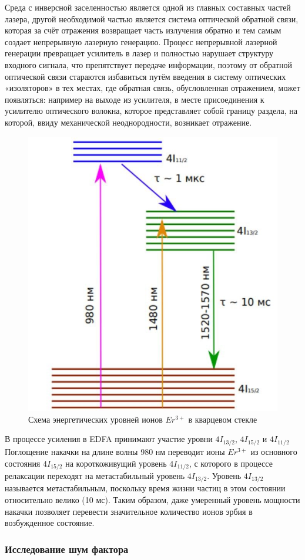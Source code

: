 \documentclass[12pt,a4paper]{article}
\begin{document}
Среда с инверсной заселенностью является одной из главных
составных частей лазера, другой необходимой частью является система
оптической обратной связи, которая за счёт отражения возвращает часть
излучения обратно и тем самым создает непрерывную лазерную генерацию. Процесс непрерывной лазерной генерации превращает
усилитель в лазер и полностью нарушает структуру входного сигнала, что
препятствует передаче информации, поэтому от обратной оптической
связи стараются избавиться путём введения в систему оптических
«изоляторов» в тех местах, где обратная связь, обусловленная
отражением, может появляться: например на выходе из усилителя, в месте
присоединения к усилителю оптического волокна, которое представляет
собой границу раздела, на которой, ввиду механической неоднородности,
возникает отражение.
\begin{figure}[h!]
		\centering
		\includegraphics[width=0.60\linewidth]{levels.jpg}
		\caption{Схема энергетических уровней ионов  $Er^{3+}$ в кварцевом стекле}
		\label{labC}
	\end{figure}

 
 В процессе усиления в EDFA принимают участие уровни $4I_{13/2}$, $4I_{15/2}$ и
$4I_{11/2}$ Поглощение накачки на длине волны 980 нм переводит ионы $Er^{3+}$  из
основного состояния $4I_{15/2}$ на короткоживущий уровень $4I_{11/2}$, с которого в
процессе релаксации переходят на метастабильный уровень $4I_{13/2}$.
Уровень $4I_{13/2}$ называется метастабильным, поскольку время жизни частиц
в этом состоянии относительно велико (10 мс). Таким образом, даже
умеренный уровень мощности накачки позволяет перевести значительное
количество ионов эрбия в возбужденное состояние.

\subsubsection*{Исследование шум фактора}
\end{document}

